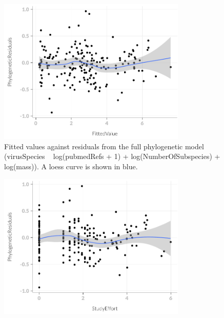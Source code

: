 \begin{knitrout}\footnotesize
{}\color{fgcolor}\begin{figure}[t]

{\centering \includegraphics[width=0.8\textwidth]{figure/subsAnalysis-1} 

}

\caption[Fitted values against residuals from the full phylogenetic model (virusSpecies ~ log(pubmedRefs + 1) + log(NumberOfSubspecies) +  log(mass))]{Fitted values against residuals from the full phylogenetic model (virusSpecies ~ log(pubmedRefs + 1) + log(NumberOfSubspecies) +  log(mass)). A loess curve is shown in blue.}\label{fig:subsAnalysis}
\end{figure}

\begin{figure}[t]

{\centering \includegraphics[width=0.8\textwidth]{figure/subsAnalysis-2} 

}
\end{figure}
\end{knitrout}
